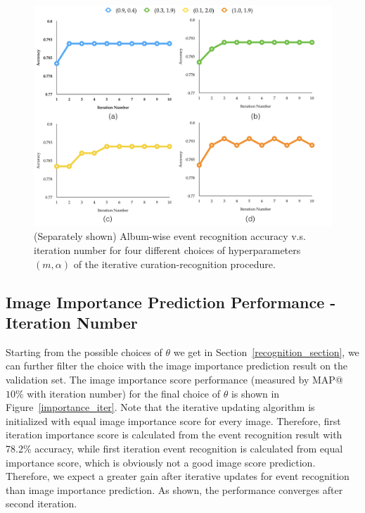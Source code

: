 \documentclass[runningheads]{llncs}
\begin{document}
\begin{figure}
\vspace{-0.1in}
\centering
\includegraphics[width=4.8in]{recognition_iter}
\caption{ (Separately shown) Album-wise event recognition accuracy v.s. iteration number for four different choices of hyperparameters $ (m, \alpha)$ of the iterative curation-recognition procedure.}
\label{recognition_iter}
\vspace{-0.2in}
\end{figure}

\subsection{Image Importance Prediction Performance - Iteration Number }
Starting from the possible choices of $\theta$ we get in Section~\ref{recognition_section}, we can further filter the choice with the image importance prediction result on the validation set. The image importance score performance (measured by MAP@$10\%$ with iteration number) for the final choice of $\theta$ is shown in Figure~\ref{importance_iter}. Note that the iterative updating algorithm is initialized with equal image importance score for every image. Therefore, first iteration importance score is calculated from the event recognition result with 78.2\% accuracy, while first iteration event recognition is calculated from equal importance score, which is  obviously not a good image score prediction. Therefore, we expect a greater gain after iterative updates for event recognition than image importance prediction. As shown, the performance converges after second iteration.
\end{document}
